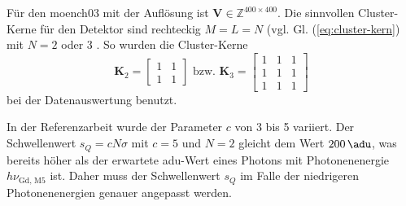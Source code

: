 \noindent
Für den \gls{moench03} mit der Auflösung  ist $\mathbf{V} \in \mathbb{Z}^{400\times 400}$. Die sinnvollen Cluster-Kerne für den Detektor sind rechteckig $M=L=N$ (vgl. Gl. (\ref{eq:cluster-kern}) mit $N = 2$ oder 3 \cite[Abschnitt 4]{cartier_micron_2014}. So wurden die Cluster-Kerne
\begin{equation}
    \mathbf{K}_{2} = \begin{bmatrix}
1 & 1\\
1 & 1
\end{bmatrix}
\text{ bzw. }
    \mathbf{K}_{3} = \begin{bmatrix}
1 & 1 & 1\\
1 & 1 & 1\\
1 & 1 & 1
\end{bmatrix}
\end{equation}
bei der Datenauswertung benutzt.

\noindent
In der Referenzarbeit wurde der Parameter $c$ von 3 bis 5 variiert. Der Schwellenwert $s_Q = cN\sigma$ mit $c=5$ und $N=2$ gleicht dem Wert $\SI{200}{\adu}$, was bereits höher als der erwartete \gls{adu}-Wert eines Photons mit Photonenenergie $h\nu_\text{Gd, M5}$ ist. Daher muss der Schwellenwert $s_Q$ im Falle der niedrigeren Photonenenergien genauer angepasst werden.


